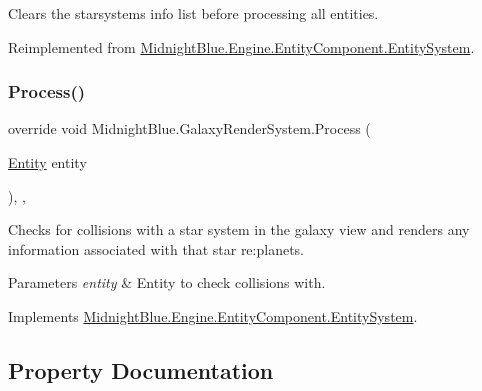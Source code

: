 Clears the starsystems info list before processing all entities. 



Reimplemented from \hyperlink{class_midnight_blue_1_1_engine_1_1_entity_component_1_1_entity_system_a779da2924653b4402ca386dbc52bd3b1}{Midnight\+Blue.\+Engine.\+Entity\+Component.\+Entity\+System}.

\hypertarget{class_midnight_blue_1_1_galaxy_render_system_aabbf61a4bcfb7c026d2d0c9fbe90569f}{}\label{class_midnight_blue_1_1_galaxy_render_system_aabbf61a4bcfb7c026d2d0c9fbe90569f} 
\subsubsection{\texorpdfstring{Process()}{Process()}}
{\footnotesize\ttfamily override void Midnight\+Blue.\+Galaxy\+Render\+System.\+Process (\begin{DoxyParamCaption}\item[{\hyperlink{class_midnight_blue_1_1_engine_1_1_entity_component_1_1_entity}{Entity}}]{entity }\end{DoxyParamCaption})\hspace{0.3cm}{\ttfamily [inline]}, {\ttfamily [protected]}, {\ttfamily [virtual]}}



Checks for collisions with a star system in the galaxy view and renders any information associated with that star re\+:planets. 


\begin{DoxyParams}{Parameters}
{\em entity} & Entity to check collisions with.\\
\hline
\end{DoxyParams}


Implements \hyperlink{class_midnight_blue_1_1_engine_1_1_entity_component_1_1_entity_system_a94aa715ac6bfe9a720c3d12d56c7598c}{Midnight\+Blue.\+Engine.\+Entity\+Component.\+Entity\+System}.



\subsection{Property Documentation}
\hypertarget{class_midnight_blue_1_1_galaxy_render_system_a2f252c64ec38b5bcf20c6b276fd5809b}{}\label{class_midnight_blue_1_1_galaxy_render_system_a2f252c64ec38b5bcf20c6b276fd5809b} 
